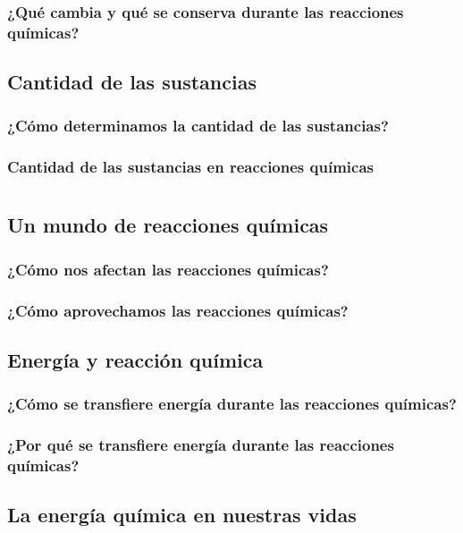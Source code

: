 \documentclass[11pt]{book}
\begin{document}
\subsection{¿Qué cambia y qué se conserva durante las reacciones químicas?}

\newpage
\section{Cantidad de las sustancias}
\subsection{¿Cómo determinamos la cantidad de las sustancias?}
\subsection{Cantidad de las sustancias en reacciones químicas}


\chapter{}

\newpage
\section{Un mundo de reacciones químicas}
\subsection{¿Cómo nos afectan las reacciones químicas?}
\subsection{¿Cómo aprovechamos las reacciones químicas?}

\newpage
\section{Energía y reacción química}
\subsection{¿Cómo se transfiere energía durante las reacciones químicas?}
\subsection{¿Por qué se transfiere energía durante las reacciones químicas?}

\newpage
\section{La energía química en nuestras vidas}
\end{document}
